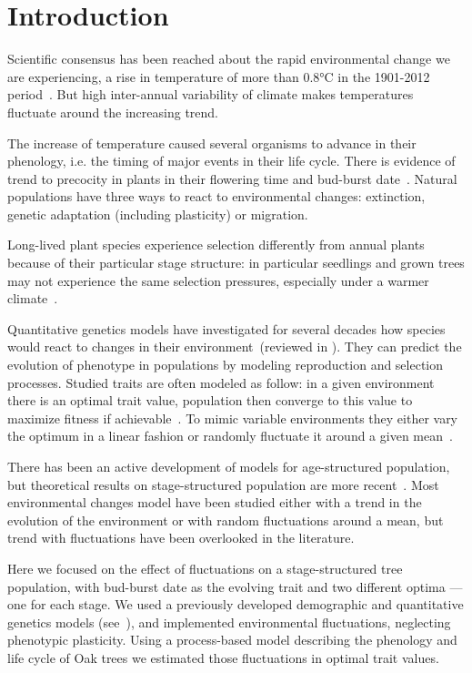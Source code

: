 \label{sec:Intro}
\section*{Introduction}

Scientific consensus has been reached about the rapid environmental change we are experiencing, a rise in temperature of more than 0.8°C in the 1901-2012 period~\citep{stocker_ipcc_2013}. But high inter-annual variability of climate makes temperatures fluctuate around the increasing trend.

The increase of temperature caused several organisms to advance in their phenology, i.e. the timing of major events in their life cycle. There is evidence of trend to precocity in plants in their flowering time and bud-burst date~\citep{alberto_adaptive_2011, gienapp_predicting_2013}. Natural populations have three ways to react to environmental changes: extinction, genetic adaptation (including plasticity) or migration.

Long-lived plant species experience selection differently from annual plants because of their particular stage structure: in particular seedlings and grown trees may not experience the same selection pressures, especially  under a warmer climate~\citep{lande_quantitative_1982, coulson_dynamics_2008, barfield_evolution_2011, engen_evolution_2011}.

Quantitative genetics models have investigated for several decades how species would react to changes in their environment~(reviewed in \citealt{burger_quantitative-genetic_2004}). They can predict the evolution of phenotype in populations by modeling reproduction and selection processes. Studied traits are often modeled as follow: in a given environment there is an optimal trait value, population then converge to this value to maximize fitness if achievable~\citep{lande_quantitative_1982}. To mimic variable environments they either vary the optimum in a linear fashion or randomly fluctuate it around a given mean~\citep{lande_role_1996}.

There has been an active development of models for age-structured population, but theoretical results on stage-structured population are more recent~\citep{barfield_evolution_2011}. Most environmental changes model have been studied either with a trend in the evolution of the environment or with random fluctuations around a mean, but trend with fluctuations have been overlooked in the literature.

Here we focused on the effect of fluctuations on a stage-structured tree population, with bud-burst date as the evolving trait and two different optima — one for each stage.
We used a previously developed demographic and quantitative genetics models (see~), and implemented environmental fluctuations, neglecting phenotypic plasticity. Using a process-based model describing the phenology and life cycle of Oak trees we estimated those fluctuations in optimal trait values.
